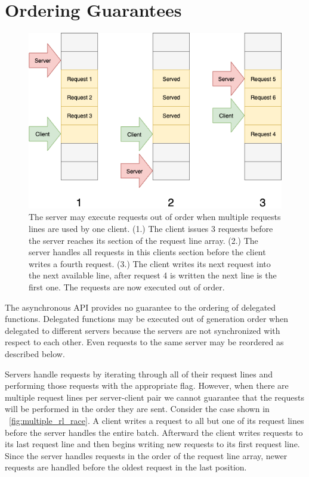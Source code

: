 \documentclass{uicthesi}
\begin{document}
\section{Ordering Guarantees}
\begin{figure}[ht!]
\centering
\includegraphics[width=0.9\columnwidth]{FIG/multiple_rl_race.png}
\caption{The server may execute requests out of order when multiple requests lines are used by one client. (1.) The client issues 3 requests before the server reaches its section of the request line array. (2.) The server handles all requests in this clients section before the client writes a fourth request. (3.) The client writes its next request into the next available line, after request 4 is written the next line is the first one. The requests are now executed out of order.}
\label{fig:mulitple_rl_race}
\end{figure}
The asynchronous API provides no guarantee to the ordering of delegated functions. Delegated functions may be executed out of generation order when delegated to different servers because the servers are not synchronized with respect to each other. Even requests to the same server may be reordered as described below.  

Servers handle requests by iterating through all of their request lines and performing those requests with the appropriate flag. However, when there are multiple request lines per server-client pair we cannot guarantee that the requests will be performed in the order they are sent. Consider the case shown in ~\ref{fig:multiple_rl_race}.  A client writes a request to all but one of its request lines before the server handles the entire batch. Afterward the client writes requests to its last request line and then begins writing new requests to its first request line. Since the server handles requests in the order of the request line array, newer requests are handled before the oldest request in the last position. 
\end{document}
